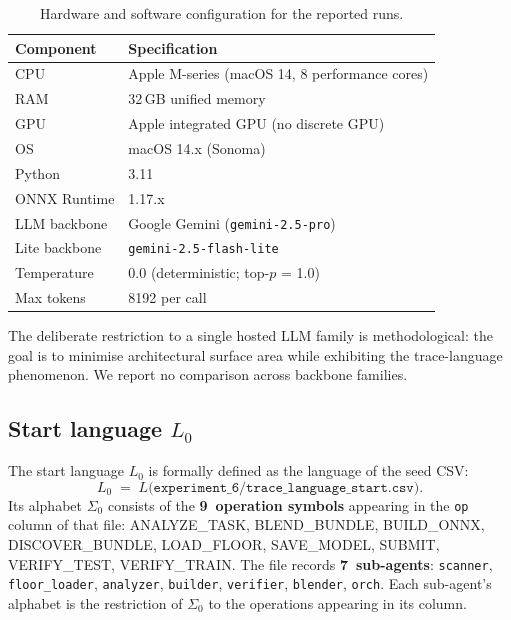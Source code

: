 \begin{table}[ht]
\centering
\caption{Hardware and software configuration for the reported runs.}
\label{tab:hardware}
\begin{tabular}{l|l}
\hline
\textbf{Component} & \textbf{Specification} \\ \hline
CPU        & Apple M-series (macOS 14, 8 performance cores) \\
RAM        & 32\,GB unified memory \\
GPU        & Apple integrated GPU (no discrete GPU) \\
OS         & macOS 14.x (Sonoma) \\
Python     & 3.11 \\
ONNX Runtime & 1.17.x \\
\hline
LLM backbone & Google Gemini (\texttt{gemini-2.5-pro}) \\
Lite backbone & \texttt{gemini-2.5-flash-lite} \\
Temperature & 0.0 (deterministic; top-$p$ = 1.0) \\
Max tokens  & 8192 per call \\
\hline
\end{tabular}
\end{table}

The deliberate restriction to a single hosted LLM family is
methodological: the goal is to minimise architectural surface area
while exhibiting the trace-language phenomenon.  We report no
comparison across backbone families.

\subsection{Start language $L_0$}

The start language $L_0$ is formally defined as the language of the
seed CSV:
\[
L_0 \;=\; L\bigl(\texttt{experiment\_6/trace\_language\_start.csv}\bigr).
\]
Its alphabet $\Sigma_0$ consists of the \textbf{9~operation
symbols} appearing in the \texttt{op} column of that file:
\textsf{ANALYZE\_TASK}, \textsf{BLEND\_BUNDLE}, \textsf{BUILD\_ONNX},
\textsf{DISCOVER\_BUNDLE}, \textsf{LOAD\_FLOOR}, \textsf{SAVE\_MODEL},
\textsf{SUBMIT}, \textsf{VERIFY\_TEST}, \textsf{VERIFY\_TRAIN}.
The file records \textbf{7~sub-agents}:
\texttt{scanner}, \texttt{floor\_loader}, \texttt{analyzer},
\texttt{builder}, \texttt{verifier}, \texttt{blender}, \texttt{orch}.
Each sub-agent's alphabet is the restriction of $\Sigma_0$ to the
operations appearing in its column.

